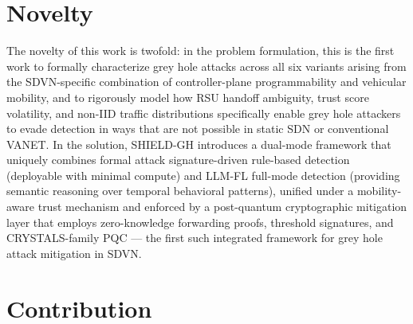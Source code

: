 \documentclass[12pt, a4paper]{report}
\newcommand{\mypar}{\vspace{0.8em}\noindent}
\begin{document}
\mypar
\section{Novelty}

The novelty of this work is twofold: in the problem formulation, this is the
first work to formally characterize grey hole attacks across all six variants
arising from the SDVN-specific combination of controller-plane programmability
and vehicular mobility, and to rigorously model how RSU handoff ambiguity, trust
score volatility, and non-IID traffic distributions specifically enable grey hole
attackers to evade detection in ways that are not possible in static SDN or
conventional VANET. In the solution, SHIELD-GH introduces a dual-mode framework
that uniquely combines formal attack signature-driven rule-based detection
(deployable with minimal compute) and LLM-FL full-mode detection (providing
semantic reasoning over temporal behavioral patterns), unified under a mobility-aware
trust mechanism and enforced by a post-quantum cryptographic mitigation layer that
employs zero-knowledge forwarding proofs, threshold signatures, and CRYSTALS-family
PQC — the first such integrated framework for grey hole attack mitigation in SDVN.



\mypar
\section{Contribution}
\end{document}
